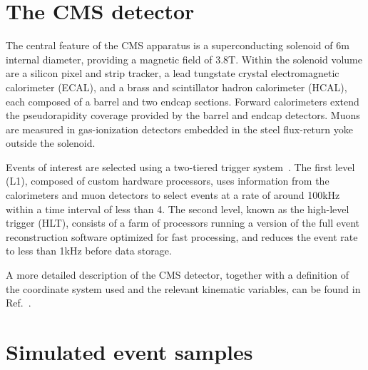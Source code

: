
\clearpage

\section{The CMS detector}
\label{sec:detector}

The central feature of the CMS apparatus is a superconducting solenoid
of 6\unit{m} internal diameter, providing a magnetic field of
3.8\unit{T}. Within the solenoid volume are a silicon pixel and strip
tracker, a lead tungstate crystal electromagnetic calorimeter (ECAL),
and a brass and scintillator hadron calorimeter (HCAL), each composed
of a barrel and two endcap sections. Forward calorimeters extend the
pseudorapidity coverage provided by the barrel and endcap
detectors. Muons are measured in gas-ionization detectors embedded in
the steel flux-return yoke outside the solenoid. 

Events of interest are selected using a two-tiered trigger
system~\cite{Khachatryan:2016bia}. The first level (L1), composed of
custom hardware processors, uses information from the calorimeters and
muon detectors to select events at a rate of around 100\unit{kHz}
within a time interval of less than 4\mus. The second level, known as
the high-level trigger (HLT), consists of a farm of processors running
a version of the full event reconstruction software optimized for fast
processing, and reduces the event rate to less than 1\unit{kHz} before
data storage.

A more detailed description of the CMS detector, together with a
definition of the coordinate system used and the relevant kinematic
variables, can be found in Ref.~\cite{Chatrchyan:2008zzk}.


\clearpage
\section{Simulated event samples}
\label{sec:simulation}

